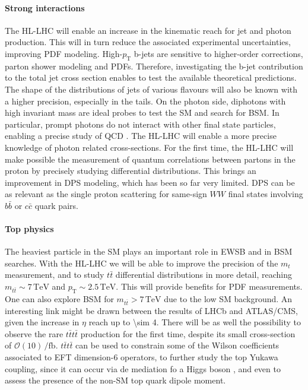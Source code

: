 \documentclass[11pt]{article}
\newcommand{\mt}{m_{t}}
\newcommand{\mtt}{m_{t\bar{t}}}
\newcommand{\pt}{p_{\text{T}}}
\begin{document}
\paragraph{Strong interactions}

The \ac{HL-LHC} will enable an increase in the kinematic reach for jet and photon production.
This will in turn reduce the associated experimental uncertainties, improving \ac{PDF} modeling.
High-\(\pt\) b-jets are sensitive to higher-order corrections, parton shower modeling and \acp{PDF}.
Therefore, investigating the b-jet contribution to the total jet cross section enables to test the available theoretical predictions.
The shape of the distributions of jets of various flavours will also be known with a higher precision, especially in the tails.
On the photon side, diphotons with high invariant mass are ideal probes to test the \ac{SM} and search for \ac{BSM}. In particular, prompt photons do not interact with other final state particles, enabling a precise study of \ac{QCD} \cite{diphoton_cdf}.
The \ac{HL-LHC} will enable a more precise knowledge of photon related cross-sections.
For the first time, the \ac{HL-LHC} will make possible the measurement of quantum correlations between partons in the proton by precisely studying differential distributions.
This brings an improvement in \ac{DPS} modeling, which has been so far very limited.
\ac{DPS} can be as relevant as the single proton scattering for same-sign \(WW\) final states involving \(b\bar{b}\) or \(c\bar{c}\) quark pairs.

\paragraph{Top physics}
The heaviest particle in the \ac{SM} plays an important role in \ac{EWSB} and in \ac{BSM} searches.
With the \ac{HL-LHC} we will be able to improve the precision of the \(\mt\) measurement, and to study \(t\bar{t}\) differential distributions in more detail, reaching \(\mtt\sim 7\,\si{\TeV}\) and \(\pt\sim 2.5\,\si{\TeV}\).
This will provide benefits for \ac{PDF} measurements.
One can also explore \ac{BSM} for \(\mtt > 7\,\si{\TeV}\) due to the low \ac{SM} background.
An interesting link might be drawn between the results of \ac{LHCb} and \ac{ATLAS}/\ac{CMS}, given the increase in \(\eta\) reach up to \num{\sim 4}.
There will be as well the possibility to observe the rare \(t\bar{t}t\bar{t}\) production for the first time, despite its small cross-section of \(\mathcal{O}(10)\,\si{\per\femto\barn}\).
\(t\bar{t}t\bar{t}\) can be used to constrain some of the Wilson coefficients associated to \ac{EFT} dimension-6 operators, to further study the top Yukawa coupling, since it can occur via de mediation fo a Higgs boson \cite{tttt}, and even to assess the presence of the non-\ac{SM} top quark dipole moment.
\end{document}
